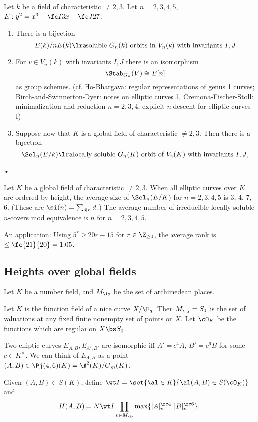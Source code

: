 \begin{thm}
Let $k$ be a field of characteristic $\ne 2,3$. Let $n=2,3,4,5$, $E:y^2 = x^3 - \fc I3 x - \fc J{27}$. 
\begin{enumerate}
\item
There is a bijection
\[
E(k)/nE(k) \lra \text{soluble $G_n(k)$-orbits in $V_n(k)$ with invariants $I,J$}
\]
\item
For $v\in V_n(k)$ with invariants $I,J$ there is an isomorphism 
\[
\Stab_{G_n}(V)\cong E[n]
\]
as group schemes.
(cf. Ho-Bhargava: regular representations of genus 1 curves; Birch-and-Swinnerton-Dyer: notes on elliptic curves 1, Cremona-Fischer-Stoll: minimalization and reduction $n=2,3,4$, explicit $n$-descent for elliptic curves I)
\item
Suppose now that $K$ is a global field of characteristic $\ne 2,3$. Then  there is a bijection
\[
\Sel_n(E/k) \lra \text{locally soluble $G_n(K)$-orbit of $V_n(K)$ with invariants $I,J$},
\]
\end{enumerate}•
\end{thm}
\begin{thm}
Let $K$ be a global field of characteristic $\ne 2,3$. When all elliptic curves over $K$ are ordered by height, the average size of $\Sel_n(E/K)$ for $n=2,3,4,5$ is 3, 4, 7, 6. (These are $\si(n)=\sum_{d\mid n}d$.) The average number of irreducible locally soluble $n$-covers mod equivalence is $n$ for $n=2,3,4,5$.
\end{thm}

An application: Using $5^r \ge 20r-15$ for $r\in \Z_{\ge 0}$, the average rank is $\le \fc{21}{20}=1.05$.

\subsection{Heights over global fields}

Let $K$ be a number field, and $M_\iy$ be the set of archimedean places. 

Let $K$ is the function field of a nice curve $X/\F_q$. Then  $M_\iy = S_0$ is the set of valuations at any fixed finite nonempty set of points on $X$. Let $\cO_K$ be the functions which are regular on $X\bs S_0$.

Two elliptic curves $E_{A,B},E_{A',B'}$ are isomorphic iff $A'=c^4A$, $B'=c^6B$ for some $c\in K^{\times}$. We can think of $E_{A,B}$ as a point $(A,B)\in \Pj(4,6)(K) = \A^2(K)/G_m(K)$.

Given $(A,B)\in S(K)$, define $\wt I = \set{\al\in K}{\al(A,B) \in S(\cO_K)}$ and
\[
H(A,B) = N\wt I \prod_{v\in M_{\iy}}\max\{|A|_v^{\rc 4}, |B|_v^{\rc 6}\}.
\]

